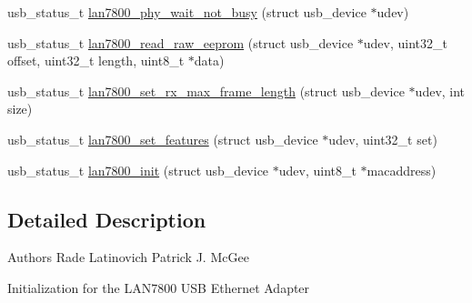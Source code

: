\begin{DoxyCompactItemize}
\item 
usb\-\_\-status\-\_\-t \hyperlink{group__lan7800_gadfe8a9f28bc2ce5929b585baed8fc407}{lan7800\-\_\-phy\-\_\-wait\-\_\-not\-\_\-busy} (struct usb\-\_\-device $\ast$udev)
\item 
usb\-\_\-status\-\_\-t \hyperlink{group__lan7800_ga03a05fda47e55dbcddeabc9980d1b671}{lan7800\-\_\-read\-\_\-raw\-\_\-eeprom} (struct usb\-\_\-device $\ast$udev, uint32\-\_\-t offset, uint32\-\_\-t length, uint8\-\_\-t $\ast$data)
\item 
usb\-\_\-status\-\_\-t \hyperlink{group__lan7800_ga659c3aa68aab22ca75556617c216f5bd}{lan7800\-\_\-set\-\_\-rx\-\_\-max\-\_\-frame\-\_\-length} (struct usb\-\_\-device $\ast$udev, int size)
\item 
usb\-\_\-status\-\_\-t \hyperlink{group__lan7800_gac6d5ce65cf6384620c04e13e67690259}{lan7800\-\_\-set\-\_\-features} (struct usb\-\_\-device $\ast$udev, uint32\-\_\-t set)
\item 
usb\-\_\-status\-\_\-t \hyperlink{group__lan7800_ga57b4e0f7b1ef285aa099af22280d4f07}{lan7800\-\_\-init} (struct usb\-\_\-device $\ast$udev, uint8\-\_\-t $\ast$macaddress)
\end{DoxyCompactItemize}


\subsection{Detailed Description}
\begin{DoxyAuthor}{Authors}
Rade Latinovich Patrick J. Mc\-Gee
\end{DoxyAuthor}
Initialization for the L\-A\-N7800 U\-S\-B Ethernet Adapter 

